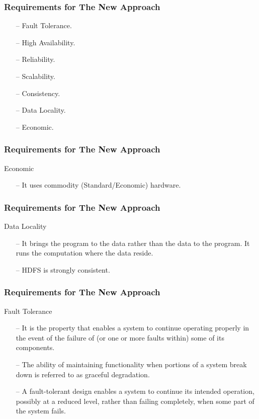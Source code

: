 \begin{frame}[c]{ }
	\frametitle{Requirements for The New Approach }
	
	
	\begin{itemize}  [<+->]
		\item [--] Fault Tolerance.
		\item [--] High Availability.
		\item [--] Reliability.
		\item [--] Scalability.
		\item [--] Consistency.
		\item [--] Data Locality.
		\item [--] Economic.
		
	\end{itemize}
\end{frame}
\begin{frame}[c]{ }
	\frametitle{Requirements for The New Approach }
	Economic
	\begin{itemize}  [<+->]
		\item [--] {\footnotesize It uses commodity (Standard/Economic) hardware}.

	\end{itemize}
\end{frame}
\begin{frame}[c]{ }
	\frametitle{Requirements for The New Approach }
	Data Locality
	\begin{itemize}  [<+->]
		\item [--] {\footnotesize It brings the program to the data rather than the data to the program. It runs the computation where the data reside.}		
		\item [--] {\footnotesize HDFS is strongly consistent.}		
	\end{itemize}
\end{frame}
\begin{frame}[c]{ }
	\frametitle{Requirements for The New Approach }
	Fault Tolerance
	\begin{itemize}  [<+->]
		\item [--] {\footnotesize It is the property that enables a system to continue operating properly in the event of the failure of (or one or more faults within) some of its components}.
		\item [--] {\footnotesize The ability of maintaining functionality when portions of a system break down is referred to as graceful degradation}.
		\item [--] {\footnotesize A fault-tolerant design enables a system to continue its intended operation, possibly at a reduced level, rather than failing completely, when some part of the system fails.}
		
	\end{itemize}
\end{frame}
